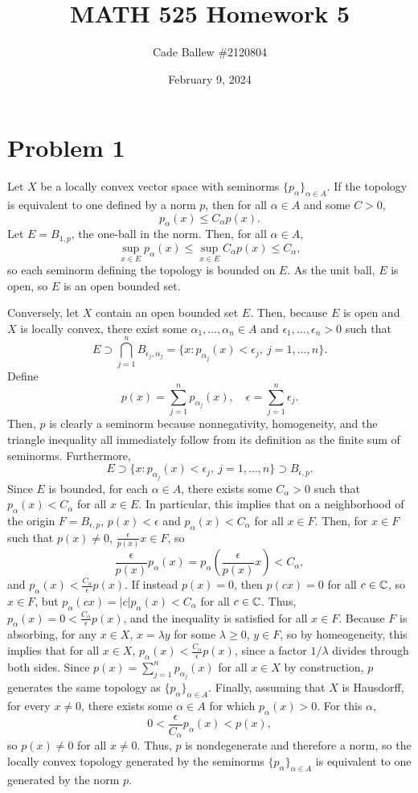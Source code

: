 \documentclass{article}
\title{MATH 525 Homework 5}
\author{Cade Ballew \#2120804}
\date{February 9, 2024}
\begin{document}
	
\maketitle
	
\section{Problem 1}
Let $X$ be a locally convex vector space with seminorms $\{p_\alpha\}_{\alpha\in A}$. If the topology is equivalent to one defined by a norm $p$, then for all $\alpha\in A$ and some $C>0$,
\[
p_\alpha(x)\leq C_\alpha p(x).
\]
Let $E=B_{1,p}$, the one-ball in the norm. Then, for all $\alpha\in A$,
\[
\sup_{x\in E}p_\alpha(x)\leq\sup_{x\in E}C_\alpha p(x)\leq C_\alpha,
\]
so each seminorm defining the topology is bounded on $E$. As the unit ball, $E$ is open, so $E$ is an open bounded set.

Conversely, let $X$ contain an open bounded set $E$. Then, because $E$ is open and $X$ is locally convex, there exist some $\alpha_1,\ldots,\alpha_n\in A$ and $\epsilon_1,\ldots,\epsilon_n>0$ such that
\[
E\supset \bigcap_{j=1}^nB_{\epsilon_j,\alpha_j}=\{x:p_{\alpha_j}(x)<\epsilon_j,~j=1,\ldots,n\}.
\]
Define 
\[
p(x)=\sum_{j=1}^np_{\alpha_j}(x),\quad \epsilon=\sum_{j=1}^n\epsilon_j.
\]
Then, $p$ is clearly a seminorm because nonnegativity, homogeneity, and the triangle inequality all immediately follow from its definition as the finite sum of seminorms. Furthermore, 
\[
E\supset\{x:p_{\alpha_j}(x)<\epsilon_j,~j=1,\ldots,n\}\supset B_{\epsilon, p}.
\]
Since $E$ is bounded, for each $\alpha\in A$, there exists some $C_\alpha>0$ such that $p_\alpha(x)<C_\alpha$ for all $x\in E$. In particular, this implies that on a neighborhood of the origin $F=B_{\epsilon, p}$, $p(x)<\epsilon$ and $p_\alpha(x)<C_\alpha$ for all $x\in F$. Then, for $x\in F$ such that $p(x)\neq0$, $\frac{\epsilon}{p(x)}x\in F$, so
\[
\frac{\epsilon}{p(x)}p_\alpha(x)=p_\alpha\left(\frac{\epsilon}{p(x)}x\right)<C_\alpha,
\]
and $p_\alpha(x)<\frac{C_\alpha}{\epsilon}p(x)$. If instead $p(x)=0$, then $p(cx)=0$ for all $c\in\mathbb{C}$, so $x\in F$, but $p_\alpha(cx)=|c|p_\alpha(x)<C_\alpha$ for all $c\in\mathbb{C}$. Thus, $p_\alpha(x)=0<\frac{C_\alpha}{\epsilon}p(x)$, and the inequality is satisfied for all $x\in F$. Because $F$ is absorbing, for any $x\in X$, $x=\lambda y$ for some $\lambda\geq0$, $y\in F$, so by homeogeneity, this implies that for all $x\in X$, $p_\alpha(x)<\frac{C_\alpha}{\epsilon}p(x)$, since a factor $1/\lambda$ divides through both sides. Since $p(x)=\sum_{j=1}^np_{\alpha_j}(x)$ for all $x\in X$ by construction, $p$ generates the same topology as $\{p_\alpha\}_{\alpha\in A}$. Finally, assuming that $X$ is Hausdorff, for every $x\neq 0$, there exists some $\alpha\in A$ for which $p_\alpha(x)>0$. For this $\alpha$,
\[
0<\frac{\epsilon}{C_\alpha}p_\alpha(x)<p(x),
\]
so $p(x)\neq 0$ for all $x\neq 0$. Thus, $p$ is nondegenerate and therefore a norm, so the locally convex topology generated by the seminorms $\{p_\alpha\}_{\alpha\in A}$ is equivalent to one generated by the norm $p$. 
\end{document}
